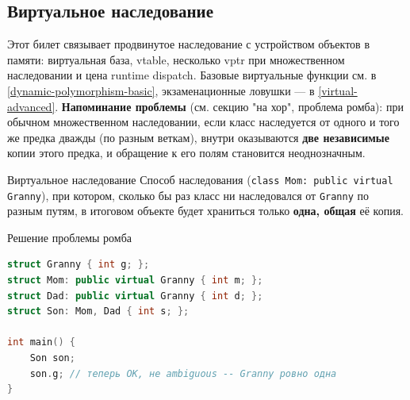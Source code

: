 \subsection{Виртуальное наследование} \label{virtual-inheritance-and-vtable}
Этот билет связывает продвинутое наследование с устройством объектов в памяти: виртуальная база, vtable, несколько vptr при множественном наследовании и цена runtime dispatch. Базовые виртуальные функции см. в \ref{dynamic-polymorphism-basic}, экзаменационные ловушки --- в \ref{virtual-advanced}.
\textbf{Напоминание проблемы} (см. секцию "на хор", проблема ромба): при обычном множественном наследовании, если класс наследуется от одного и того же предка дважды (по разным веткам), внутри оказываются \textbf{две независимые} копии этого предка, и обращение к его полям становится неоднозначным.
\begin{definition}{Виртуальное наследование}{}
Способ наследования (\texttt{class Mom: public virtual Granny}), при котором, сколько бы раз класс ни наследовался от \texttt{Granny} по разным путям, в итоговом объекте будет храниться только \textbf{одна, общая} её копия.
\end{definition}
\begin{implementation}{Решение проблемы ромба}{}
\begin{lstlisting}[language=C++]
struct Granny { int g; };
struct Mom: public virtual Granny { int m; };
struct Dad: public virtual Granny { int d; };
struct Son: Mom, Dad { int s; };

int main() {
    Son son;
    son.g; // теперь OK, не ambiguous -- Granny ровно одна
}
\end{lstlisting}
\end{implementation}
